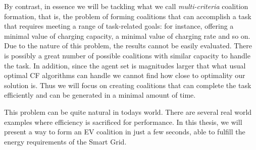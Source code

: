 By contrast, in essence we will be tackling what we call {\em multi-criteria} coalition formation, that is, the problem of forming coalitions that can accomplish a task that requires meeting a range of task-related goals: for instance, offering a minimal value of charging capacity, a minimal value of charging rate and so on. Due to the nature of this problem, the results cannot be easily evaluated. There is possibly a great number of possible coalitions with similar capacity to handle the task. In addition, since the agent set is magnitudes larger that what usual optimal CF algorithms can handle we cannot find how close to optimality our solution is. Thus we will focus on creating coalitions that can complete the task efficiently and can be generated in a minimal amount of time.

This problem can be quite natural in todays world. There are several real world examples where efficiency is sacrificed for performance. In this thesis, we will present a way to form an EV coalition in just a few seconds, able to fulfill the energy requirements of the Smart Grid.





